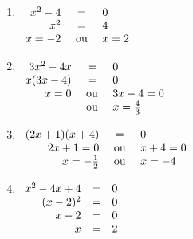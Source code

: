 \begin{exo}[type=solution]
\begin{sol}
\begin{enumerate}[label=\bf{\alph*})\,]
\item 
$
\begin{array}[t]{rcl}
	x^2-4 &  = & 0 \\ 
	x^2 & = & 4  \\
	x=-2  & \text{ ou }& x=2 \\
\end{array}
$
\item 
$
\begin{array}[t]{rcl}
3x^2-4x &  = & 0 \\ 
x(3x-4) & = & 0  \\
x=0  & \text{ ou }& 3x-4=0 \\
     & \text{ ou }& x=\frac{4}{3} \\
\end{array}
$
\item 
$
\begin{array}[t]{rcl}
(2x+1)(x+4) &  = & 0 \\ 
2x+1=0 & \text{ ou } & x+4=0  \\
x=-\frac{1}{2}  & \text{ ou }& x=-4 \\
\end{array}
$
\item 
$
\begin{array}[t]{rcl}
x^2-4x+4 &  = & 0 \\ 
(x-2)^2 & = & 0  \\
x-2 & = & 0  \\
x & = & 2 \\
\end{array}
$





\end{enumerate}	 	
\end{sol}	

	
\end{exo}	










